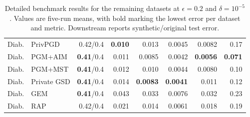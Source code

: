 \begin{table}[!tbp]
{\begin{tabular}{llrrrrrr}
    \midrule
    Diab. & PrivPGD & 0.42/0.4 & \textbf{0.010} & 0.013 & 0.0045 & 0.0082 & 0.17 \\
    Diab. & PGM+AIM & \textbf{0.41}/0.4 & 0.011 & 0.0085 & 0.0042 & \textbf{0.0056} & \textbf{0.071} \\
    Diab. & PGM+MST & \textbf{0.41}/0.4 & 0.012 & 0.010 & 0.0044 & 0.0080 & 0.10 \\
    Diab. & Private GSD & \textbf{0.41}/0.4 & 0.014 & \textbf{0.0083} & \textbf{0.0041} & 0.011 & 0.12 \\
    Diab. & GEM & \textbf{0.41}/0.4 & 0.043 & 0.033 & 0.0076 & 0.032 & 0.23 \\
    Diab. & RAP & 0.42/0.4 & 0.021 & 0.014 & 0.0061 & 0.018 & 0.19 \\
    \bottomrule
  \end{tabular}}
  \caption{Detailed benchmark results for the remaining datasets at \(\epsilon = 0.2\) and \(\delta = 10^{-5}\). Values are five-run means, with bold marking the lowest error per dataset and metric. Downstream reports synthetic/original test error.}
  \label{tab:app-privpgd-e02-rest}
\end{table}
